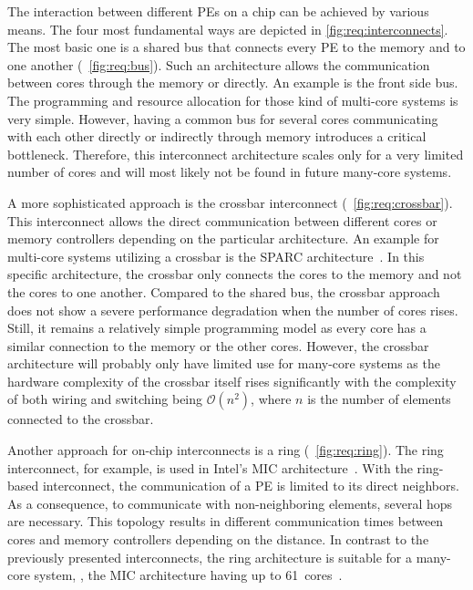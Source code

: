 The interaction between different \acp{PE} on a chip can be achieved by various means. The four most fundamental ways are depicted in \cref{fig:req:interconnects}. The most basic one is a shared bus that connects every \ac{PE} to the memory and to one another (\cf~\cref{fig:req:bus}). Such an architecture allows the communication between cores through the memory or directly. An example is the front side bus. The programming and resource allocation for those kind of multi-core systems is very simple. However, having a common bus for several cores communicating with each other directly or indirectly through memory introduces a critical bottleneck. Therefore, this interconnect architecture scales only for a very limited number of cores and will most likely not be found in future many-core systems.

A more sophisticated approach is the crossbar interconnect (\cf~\cref{fig:req:crossbar}). This interconnect allows the direct communication between different cores or memory controllers depending on the particular architecture. An example for multi-core systems utilizing a crossbar is the SPARC architecture~\cite{SPARC-1992}. In this specific architecture, the crossbar only connects the cores to the memory and not the cores to one another. Compared to the shared bus, the crossbar approach does not show a severe performance degradation when the number of cores rises. Still, it remains a relatively simple programming model as every core has a similar connection to the memory or the other cores. However, the crossbar architecture will probably only have limited use for many-core systems as the hardware complexity of the crossbar itself rises significantly with the complexity of both wiring and switching being \(\mathcal{O}(n^2)\), where \(n\) is the number of elements connected to the crossbar.

Another approach for on-chip interconnects is a ring (\cf~\cref{fig:req:ring}). The ring interconnect, for example, is used in Intel's \ac{MIC} architecture~\cite{Chrysos-2012-XeonPhiBus}. With the ring-based interconnect, the communication of a \ac{PE} is limited to its direct neighbors. As a consequence, to communicate with non-neighboring elements, several hops are necessary. This topology results in different communication times between cores and memory controllers depending on the distance. In contrast to the previously presented interconnects, the ring architecture is suitable for a many-core system, \eg, the \ac{MIC} architecture having up to 61~cores~\cite{Intel-2015-XeonPhiDatasheet}.

